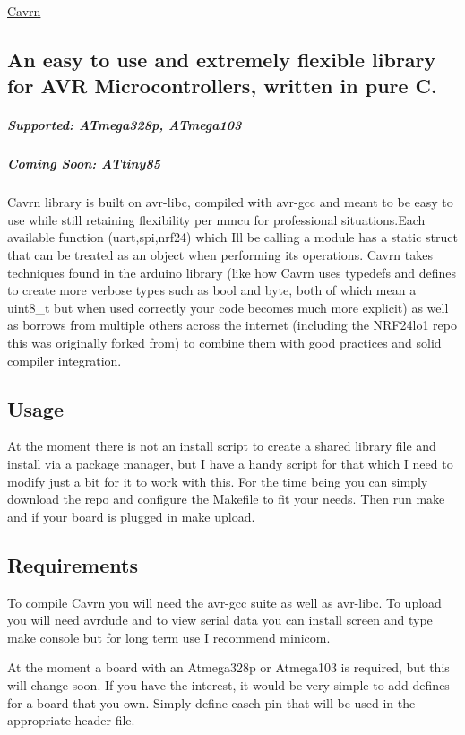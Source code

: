 \hyperlink{src_2cavrn_8h_af129c0b3bc3584bd198babebfc7c3f69}{Cavrn} \subsection*{An easy to use and extremely flexible library for A\+V\+R Microcontrollers, written in pure C.}



 \subparagraph*{Supported\+: A\+Tmega328p, A\+Tmega103}

\subparagraph*{Coming Soon\+: A\+Ttiny85}

Cavrn library is built on avr-\/libc, compiled with avr-\/gcc and meant to be easy to use while still retaining flexibility per mmcu for professional situations.\+Each available function (uart,spi,nrf24) which I\textquotesingle{}ll be calling a module has a static struct that can be treated as an object when performing its operations. Cavrn takes techniques found in the arduino library (like how Cavrn uses typedefs and defines to create more verbose types such as bool and byte, both of which mean a uint8\+\_\+t but when used correctly your code becomes much more explicit) as well as borrows from multiple others across the internet (including the N\+R\+F24lo1 repo this was originally forked from) to combine them with good practices and solid compiler integration.

\subsection*{Usage}

At the moment there is not an install script to create a shared library file and install via a package manager, but I have a handy script for that which I need to modify just a bit for it to work with this. For the time being you can simply download the repo and configure the {\ttfamily Makefile} to fit your needs. Then run {\ttfamily make} and if your board is plugged in {\ttfamily make upload}.

\subsection*{Requirements}

To compile Cavrn you will need the avr-\/gcc suite as well as avr-\/libc. To upload you will need avrdude and to view serial data you can install screen and type {\ttfamily make console} but for long term use I recommend minicom.

At the moment a board with an Atmega328p or Atmega103 is required, but this will change soon. If you have the interest, it would be very simple to add defines for a board that you own. Simply define easch pin that will be used in the appropriate header file.



